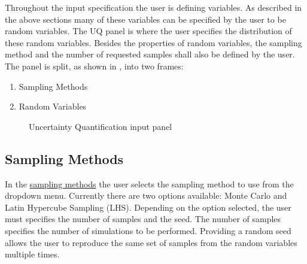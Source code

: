 Throughout the input specification the user is defining variables. As
described in the above sections many of these variables can be
specified by the user to be random variables. The UQ panel is where the user specifies the distribution of these random variables. Besides the properties of random variables, the sampling method and the number of requested samples shall also be defined by the user. The panel is split, as shown
in , into two frames:

\begin{enumerate}
\item Sampling Methods 
\item Random Variables
\end{enumerate}

\begin{figure}[!htbp]
  \caption{Uncertainty Quantification input panel}
  \label{fig:uq_panel}
\end{figure}

\subsection{Sampling Methods}
In the \href{https://dakota.sandia.gov//sites/default/files/docs/6.9/html-ref/method-sampling.html}{sampling methods} the user selects the sampling 
method to use from the dropdown menu. Currently there are two options available: 
Monte Carlo and Latin Hypercube Sampling (LHS). Depending on the option selected, the user must specifies the number of samples and the seed. The number of samples specifies the number of simulations to be performed. Providing a random seed allows the user to reproduce the same set of samples from the random variables multiple times.

